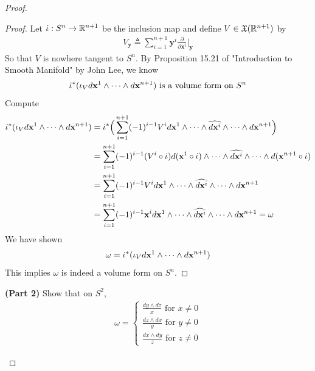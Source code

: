 \documentclass{report}
\begin{document}
\begin{proof}
\begin{theorem}
\end{theorem}
\begin{proof}
Let $\dot{\iota} : S^{n}\rightarrow \mathbb{R}^{n+1}$ be the inclusion map and define $V \in \mathfrak{X}(\mathbb{R}^{n+1})$ by 
\begin{align*}
V_{\textbf{y}}\triangleq  \sum_{i=1}^{n+1} \textbf{y}^i \frac{\partial }{\partial \textbf{x}^i}\Big|_\textbf{y}
\end{align*}
So that $V$ is nowhere tangent to  $S^{n}$. By Proposition 15.21 of "Introduction to Smooth Manifold" by John Lee, we know  
\begin{align*}
\dot{\iota}^* (\iota_V d\textbf{x}^1 \wedge  \cdots \wedge  d\textbf{x}^{n+1}   ) \text{ is a volume form on }S^n
\end{align*}
Compute
\begin{align*}
\dot{\iota}^*   (\iota_V d\textbf{x}^1\wedge  \cdots \wedge  d\textbf{x}^{n+1}  )&=\dot{\iota}^* \Big(\sum_{i=1}^{n+1}(-1)^{i-1}V^i d\textbf{x}^1 \wedge  \cdots \wedge   \widehat{d\textbf{x}^i} \wedge  \cdots \wedge  d\textbf{x}^{n+1}    \Big)   \\
&=\sum_{i=1}^{n+1}(-1)^{i-1} (V^i \circ \dot{\iota}) d(\textbf{x}^1\circ \dot{\iota}) \wedge  \cdots \wedge \widehat{d\textbf{x}^i} \wedge  \cdots \wedge  d(\textbf{x}^{n+1}\circ \dot{\iota})       \\
&= \sum_{i=1}^{n+1}(-1)^{i-1}V^i d\textbf{x}^1 \wedge  \cdots \wedge  \widehat{d\textbf{x}^i} \wedge  \cdots \wedge d\textbf{x}^{n+1}   \\
&= \sum_{i=1}^{n+1}(-1)^{i-1}\textbf{x}^i d\textbf{x}^1 \wedge  \cdots \wedge  \widehat{d\textbf{x}^i} \wedge  \cdots \wedge d\textbf{x}^{n+1}=\omega
\end{align*}
We have shown 
\begin{align*}
\omega = \dot{\iota}^*(\iota_V d\textbf{x}^1 \wedge  \cdots \wedge  d\textbf{x}^{n+1}   )   
\end{align*}
This implies $\omega$ is indeed a volume form on $S^n$.  
\end{proof}
\begin{theorem}
\textbf{(Part 2)} Show that on $S^2$, 
 \begin{align*}
 \omega= \begin{cases}
   \frac{dy \wedge  dz}{x}\text{ for }x\neq 0\\
   \frac{dz \wedge  dx}{y}\text{ for }y\neq 0\\
   \frac{dx \wedge  dy}{z}\text{ for }z\neq 0
 \end{cases}
 \end{align*}
\end{theorem}

\end{proof}
\end{document}
